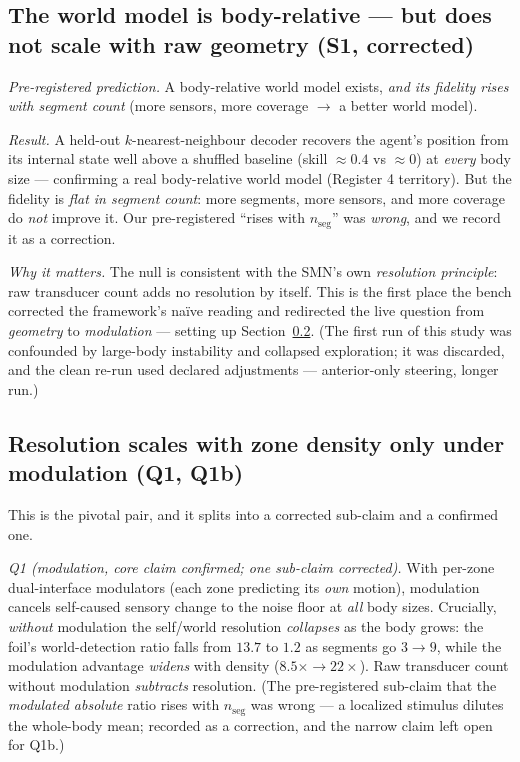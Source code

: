 \documentclass[utf8]{FrontiersinHarvard} %
\begin{document}
\subsection{The world model is body-relative --- but does not scale with raw geometry (S1, corrected)}\label{sec:s1}
\emph{Pre-registered prediction.} A body-relative world model exists, \emph{and its fidelity rises with segment count} (more sensors, more coverage $\to$ a better world model).

\emph{Result.} A held-out $k$-nearest-neighbour decoder recovers the agent's position from its internal state well above a shuffled baseline (skill $\approx 0.4$ vs $\approx 0$) at \emph{every} body size --- confirming a real body-relative world model (Register 4 territory). But the fidelity is \emph{flat in segment count}: more segments, more sensors, and more coverage do \emph{not} improve it. Our pre-registered ``rises with $n_{\text{seg}}$'' was \emph{wrong}, and we record it as a correction.

\emph{Why it matters.} The null is consistent with the SMN's own \emph{resolution principle}: raw transducer count adds no resolution by itself. This is the first place the bench corrected the framework's na\"ive reading and redirected the live question from \emph{geometry} to \emph{modulation} --- setting up Section~\ref{sec:q1}. (The first run of this study was confounded by large-body instability and collapsed exploration; it was discarded, and the clean re-run used declared adjustments --- anterior-only steering, longer run.)

\subsection{Resolution scales with zone density only under modulation (Q1, Q1b)}\label{sec:q1}
This is the pivotal pair, and it splits into a corrected sub-claim and a confirmed one.

\emph{Q1 (modulation, core claim confirmed; one sub-claim corrected).} With per-zone dual-interface modulators (each zone predicting its \emph{own} motion), modulation cancels self-caused sensory change to the noise floor at \emph{all} body sizes. Crucially, \emph{without} modulation the self/world resolution \emph{collapses} as the body grows: the foil's world-detection ratio falls from $13.7$ to $1.2$ as segments go $3\to9$, while the modulation advantage \emph{widens} with density ($8.5\times \to 22\times$). Raw transducer count without modulation \emph{subtracts} resolution. (The pre-registered sub-claim that the \emph{modulated absolute} ratio rises with $n_{\text{seg}}$ was wrong --- a localized stimulus dilutes the whole-body mean; recorded as a correction, and the narrow claim left open for Q1b.)
\end{document}
